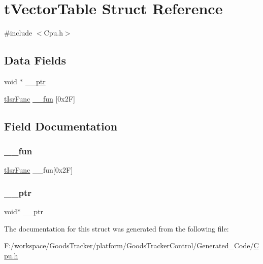\hypertarget{structt_vector_table}{}\section{t\+Vector\+Table Struct Reference}
\label{structt_vector_table}


{\ttfamily \#include $<$Cpu.\+h$>$}

\subsection*{Data Fields}
\begin{DoxyCompactItemize}
\item 
void $\ast$ \hyperlink{structt_vector_table_a048f06ea03d2c16f7368d2ec9939341c}{\+\_\+\+\_\+ptr}
\item 
\hyperlink{group___cpu__module_gafea04d3e8135767c03ce099f02e97437}{t\+Isr\+Func} \hyperlink{structt_vector_table_a4cc2824a7ce711c0239df95f04a56626}{\+\_\+\+\_\+fun} \mbox{[}0x2\+F\mbox{]}
\end{DoxyCompactItemize}


\subsection{Field Documentation}
\mbox{\label{structt_vector_table_a4cc2824a7ce711c0239df95f04a56626}} 
\subsubsection{\texorpdfstring{\+\_\+\+\_\+fun}{\_\_fun}}
{\footnotesize\ttfamily \hyperlink{group___cpu__module_gafea04d3e8135767c03ce099f02e97437}{t\+Isr\+Func} \+\_\+\+\_\+fun\mbox{[}0x2\+F\mbox{]}}

\mbox{\label{structt_vector_table_a048f06ea03d2c16f7368d2ec9939341c}} 
\subsubsection{\texorpdfstring{\+\_\+\+\_\+ptr}{\_\_ptr}}
{\footnotesize\ttfamily void$\ast$ \+\_\+\+\_\+ptr}



The documentation for this struct was generated from the following file\+:\begin{DoxyCompactItemize}
\item 
F\+:/workspace/\+Goods\+Tracker/platform/\+Goods\+Tracker\+Control/\+Generated\+\_\+\+Code/\hyperlink{_cpu_8h}{Cpu.\+h}\end{DoxyCompactItemize}
